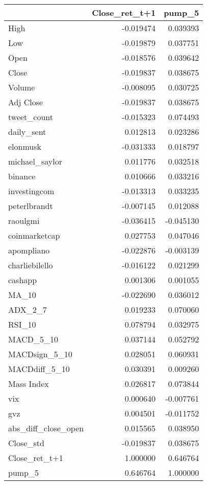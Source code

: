 \begin{tabular}{lrr}
\toprule
{} &  Close\_ret\_t+1 &    pump\_5 \\
\midrule
High                &      -0.019474 &  0.039393 \\
Low                 &      -0.019879 &  0.037751 \\
Open                &      -0.018576 &  0.039642 \\
Close               &      -0.019837 &  0.038675 \\
Volume              &      -0.008095 &  0.030725 \\
Adj Close           &      -0.019837 &  0.038675 \\
tweet\_count         &      -0.015323 &  0.074493 \\
daily\_sent          &       0.012813 &  0.023286 \\
elonmusk            &      -0.031333 &  0.018797 \\
michael\_saylor      &       0.011776 &  0.032518 \\
binance             &       0.010666 &  0.033216 \\
investingcom        &      -0.013313 &  0.033235 \\
peterlbrandt        &      -0.007145 &  0.012088 \\
raoulgmi            &      -0.036415 & -0.045130 \\
coinmarketcap       &       0.027753 &  0.047046 \\
apompliano          &      -0.022876 & -0.003139 \\
charliebilello      &      -0.016122 &  0.021299 \\
cashapp             &       0.001306 &  0.001055 \\
MA\_10               &      -0.022690 &  0.036012 \\
ADX\_2\_7             &       0.019233 &  0.070060 \\
RSI\_10              &       0.078794 &  0.032975 \\
MACD\_5\_10           &       0.037144 &  0.052792 \\
MACDsign\_5\_10       &       0.028051 &  0.060931 \\
MACDdiff\_5\_10       &       0.030391 &  0.009260 \\
Mass Index          &       0.026817 &  0.073844 \\
vix                 &       0.000640 & -0.007761 \\
gvz                 &       0.004501 & -0.011752 \\
abs\_diff\_close\_open &       0.015565 &  0.038950 \\
Close\_std           &      -0.019837 &  0.038675 \\
Close\_ret\_t+1       &       1.000000 &  0.646764 \\
pump\_5              &       0.646764 &  1.000000 \\
\bottomrule
\end{tabular}
